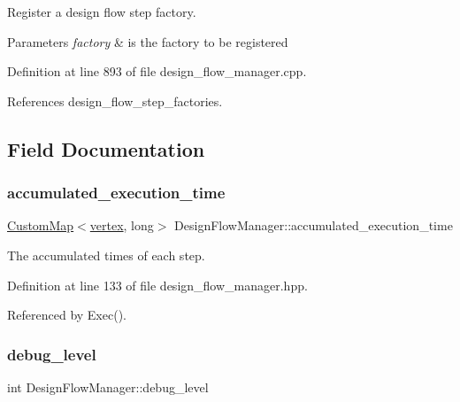 Register a design flow step factory. 


\begin{DoxyParams}{Parameters}
{\em factory} & is the factory to be registered \\
\hline
\end{DoxyParams}


Definition at line 893 of file design\+\_\+flow\+\_\+manager.\+cpp.



References design\+\_\+flow\+\_\+step\+\_\+factories.



\subsection{Field Documentation}
\mbox{\label{classDesignFlowManager_a63c70d202fd40d1db1f537d970e8fae3}} 
\subsubsection{\texorpdfstring{accumulated\+\_\+execution\+\_\+time}{accumulated\_execution\_time}}
{\footnotesize\ttfamily \hyperlink{custom__map_8hpp_a18ca01763abbe3e5623223bfe5aaac6b}{Custom\+Map}$<$\hyperlink{graph_8hpp_abefdcf0544e601805af44eca032cca14}{vertex}, long$>$ Design\+Flow\+Manager\+::accumulated\+\_\+execution\+\_\+time\hspace{0.3cm}{\ttfamily [private]}}



The accumulated times of each step. 



Definition at line 133 of file design\+\_\+flow\+\_\+manager.\+hpp.



Referenced by Exec().

\mbox{\label{classDesignFlowManager_a339b488636513296591ea1491e19744d}} 
\subsubsection{\texorpdfstring{debug\+\_\+level}{debug\_level}}
{\footnotesize\ttfamily int Design\+Flow\+Manager\+::debug\+\_\+level\hspace{0.3cm}{\ttfamily [private]}}



